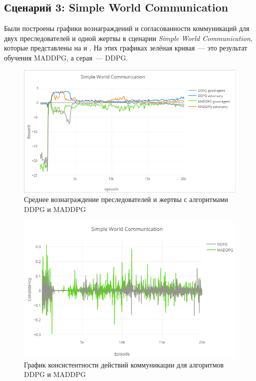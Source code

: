 \subsection{Сценарий 3: Simple World Communication} \label{exp-results-svc}

Были построены графики вознаграждений и согласованности коммуникаций для двух преследователей и одной жертвы в сценарии \textit{Simple World Communication}, которые представлены на  и . На этих графиках зелёная кривая~--- это результат обучения MADDPG, а серая~--- DDPG.

\begin{figure}[ht!]
    \center
    \includegraphics [scale=0.6] {my_folder/images/ch5/swc-rew.png}
    \caption{Среднее вознаграждение преследователей и жертвы с алгоритмами DDPG и MADDPG}
    \label{fig:result-swc-rew}
\end{figure}

\begin{figure}[ht!]
    \center
    \includegraphics [scale=0.6] {my_folder/images/ch5/swc-comm.png}
    \caption{График консистентности действий коммуникации для алгоритмов DDPG и MADDPG}
    \label{fig:result-swc-comm}
\end{figure}

